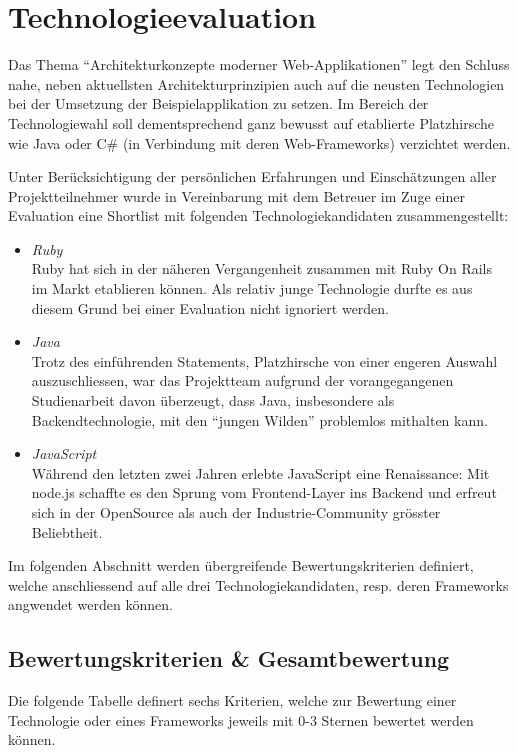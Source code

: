 \section{Technologieevaluation}
Das Thema ``Architekturkonzepte moderner Web-Applikationen'' legt den Schluss nahe, neben aktuellsten Architekturprinzipien auch auf die neusten Technologien bei der Umsetzung der Beispielapplikation zu setzen. Im Bereich der Technologiewahl soll dementsprechend ganz bewusst auf etablierte Platzhirsche wie Java oder C\# (in Verbindung mit deren Web-Frameworks) verzichtet werden.

Unter Berücksichtigung der persönlichen Erfahrungen und Einschätzungen aller Projektteilnehmer wurde in Vereinbarung mit dem Betreuer im Zuge einer Evaluation eine Shortlist mit folgenden Technologiekandidaten zusammengestellt:

\begin{itemize}
	\item \emph{Ruby}\\
	Ruby hat sich in der näheren Vergangenheit zusammen mit Ruby On Rails im Markt etablieren können. Als relativ junge Technologie durfte es aus diesem Grund bei einer Evaluation nicht ignoriert werden.

	\item \emph{Java}\\
	Trotz des einführenden Statements, Platzhirsche von einer engeren Auswahl auszuschliessen, war das Projektteam aufgrund der vorangegangenen Studienarbeit davon überzeugt, dass Java, insbesondere als Backendtechnologie, mit den ``jungen Wilden'' problemlos mithalten kann.

	\item \emph{JavaScript}\\
	Während den letzten zwei Jahren erlebte JavaScript eine Renaissance: Mit node.js schaffte es den Sprung vom Frontend-Layer ins Backend und erfreut sich in der OpenSource als auch der Industrie-Community grösster Beliebtheit.
\end{itemize}

Im folgenden Abschnitt werden übergreifende Bewertungskriterien definiert, welche anschliessend auf alle drei Technologiekandidaten, resp. deren Frameworks angwendet werden können.

\newpage
\subsection{Bewertungskriterien \& Gesamtbewertung}
Die folgende Tabelle definert sechs Kriterien, welche zur Bewertung einer Technologie oder eines Frameworks jeweils mit 0-3 Sternen bewertet werden können.

